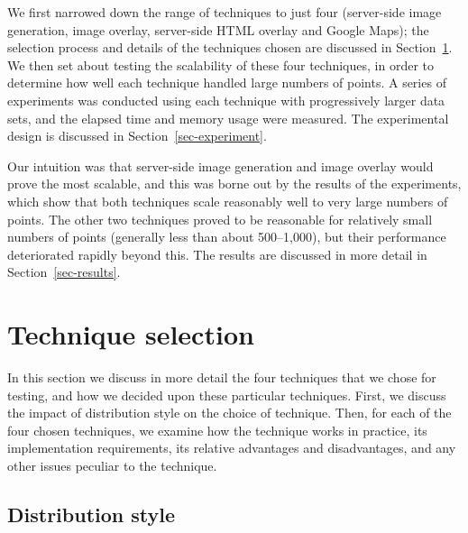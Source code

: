 \documentclass[acmtocl,acmnow]{acmtrans2m}
\begin{document}
We first narrowed down the range of techniques to just four (server-side
image generation, image overlay, server-side HTML overlay and Google
Maps); the selection process and details of the techniques chosen are
discussed in Section~\ref{sec-techniques}. We then set about testing the
scalability of these four techniques, in order to determine how well
each technique handled large numbers of points. A series of experiments
was conducted using each technique with progressively larger data sets,
and the elapsed time and memory usage were measured. The experimental
design is discussed in Section~\ref{sec-experiment}.

Our intuition was that server-side image generation and image overlay
would prove the most scalable, and this was borne out by the results of
the experiments, which show that both techniques scale reasonably well
to very large numbers of points. The other two techniques proved to be
reasonable for relatively small numbers of points (generally less than
about 500--1,000), but their performance deteriorated rapidly beyond
this. The results are discussed in more detail in
Section~\ref{sec-results}.


\section{Technique selection}
\label{sec-techniques}

In this section we discuss in more detail the four techniques that we
chose for testing, and how we decided upon these particular techniques.
First, we discuss the impact of distribution style on the choice of
technique. Then, for each of the four chosen techniques, we examine how
the technique works in practice, its implementation requirements, its
relative advantages and disadvantages, and any other issues peculiar to
the technique.


\subsection{Distribution style}
\label{sec-distribution}
\end{document}
